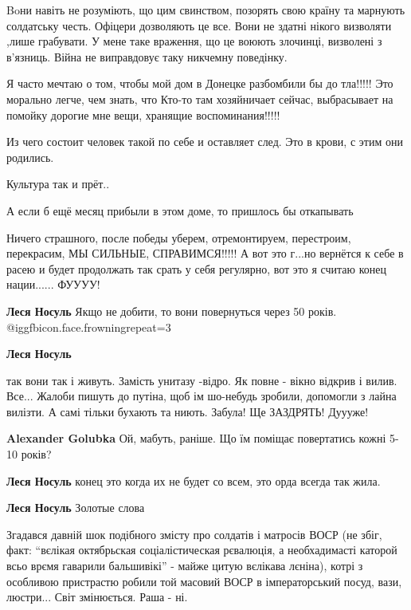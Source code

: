 \begin{itemize}

Boни навіть не розуміють, що цим свинством, позорять свою країну та марнують
солдатську честь. Офіцери дозволяють це все. Вони не здатні нікого визволяти
,лише грабувати. У мене таке враження, що це воюють злочинці, визволені з
в'язниць. Війна не виправдовує таку никчемну поведінку.


Я часто мечтаю о том, чтобы мой дом в Донецке разбомбили бы до тла!!!!! Это
морально легче, чем знать, что Кто-то там хозяйничает сейчас, выбрасывает на
помойку дорогие мне вещи, хранящие воспоминания!!!!!

Из чего состоит человек такой по себе и оставляет след. Это в крови, с этим они родились.

Культура так и прёт..

А если б ещё месяц прибыли в этом доме, то пришлось бы откапывать


Ничего страшного, после победы уберем, отремонтируем, перестроим, перекрасим,
МЫ СИЛЬНЫЕ, СПРАВИМСЯ!!!!! А вот это г...но вернётся к себе в расею и будет
продолжать так срать у себя регулярно, вот это я считаю конец нации......
ФУУУУ!

\begin{itemize} %
\textbf{Леся Носуль} Якщо не добити, то вони повернуться через 50 років. @igg{fbicon.face.frowning}{repeat=3}

\textbf{Леся Носуль} 

так вони так і живуть. Замість унитазу -відро. Як повне - вікно відкрив і вилив.
Все... Жалоби пишуть до путіна, щоб ім шо-небудь зробили, допомогли з лайна
вилізти. А самі тільки бухають та ниють. Забула! Ще ЗАЗДРЯТЬ! Дуууже!

\textbf{Alexander Golubka} Ой, мабуть, раніше. Що їм поміщає повертатись кожні 5-10 років?

\textbf{Леся Носуль} конец это когда их не будет со всем, это орда всегда так жила.

\textbf{Леся Носуль} Золотые слова
\end{itemize} %


Згадався давній шок подібного змісту про солдатів і матросів ВОСР (не збіг,
факт: \enquote{вєлікая октябрьская соціалістическая рєвалюція, а необхадимасті каторой
всьо врємя гаварили бальшивікі} - майже цитую вєлікава лєніна), котрі з
особливою пристрастю робили той масовий ВОСР в імператорський посуд, вази,
люстри... Світ змінюється. Раша - ні.


\end{itemize}
